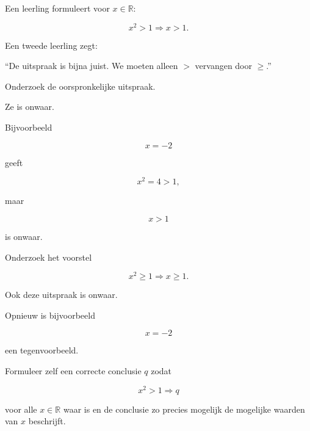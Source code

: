 \documentclass{ximera}
\begin{document}
\begin{oefening}{\oefG}

Een leerling formuleert voor $x\in\mathbb{R}$:

\[
x^2>1\Rightarrow x>1.
\]

Een tweede leerling zegt:

\begin{center}
``De uitspraak is bijna juist. We moeten alleen $>$ vervangen door
$\geq$.''
\end{center}

\begin{question}

Onderzoek de oorspronkelijke uitspraak.

\begin{oplossing}

Ze is onwaar.

Bijvoorbeeld

\[
x=-2
\]

geeft

\[
x^2=4>1,
\]

maar

\[
x>1
\]

is onwaar.

\end{oplossing}

\end{question}


\begin{question}

Onderzoek het voorstel

\[
x^2\geq1\Rightarrow x\geq1.
\]

\begin{oplossing}

Ook deze uitspraak is onwaar.

Opnieuw is bijvoorbeeld

\[
x=-2
\]

een tegenvoorbeeld.

\end{oplossing}

\end{question}


\begin{question}

Formuleer zelf een correcte conclusie $q$ zodat

\[
x^2>1\Rightarrow q
\]

voor alle $x\in\mathbb{R}$ waar is en de conclusie zo precies mogelijk
de mogelijke waarden van $x$ beschrijft.


\end{question}
\end{oefening}
\end{document}

